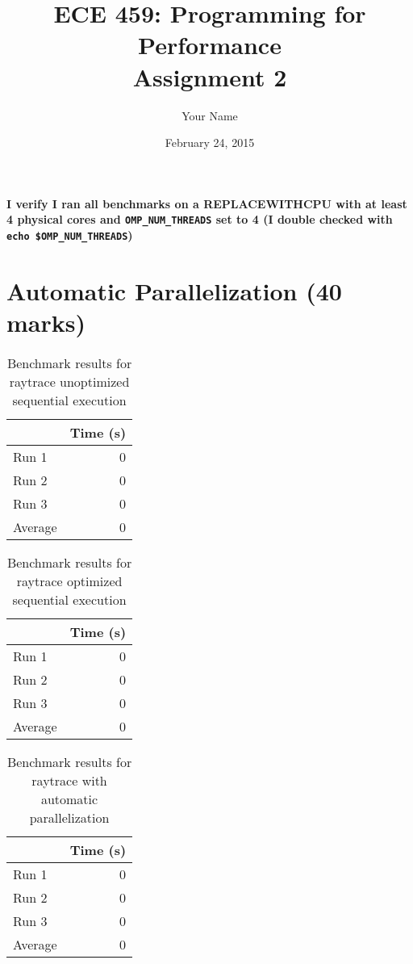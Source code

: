 \documentclass[12pt]{article}
\title{ECE 459: Programming for Performance\\Assignment 2}
\author{Your Name}
\date{February 24, 2015}
\begin{document}
\maketitle

{\bf I verify I ran all benchmarks on a REPLACEWITHCPU with at least 4 physical cores and
{\tt OMP\_NUM\_THREADS} set to 4 (I double checked with
{\tt echo \$OMP\_NUM\_THREADS})}

\section*{Automatic Parallelization (40 marks)}

\begin{table}[H]
  \centering
  \begin{tabular}{lr}
    & {\bf Time (s)} \\
    \hline
    Run 1 & 0 \\
    Run 2 & 0 \\
    Run 3 & 0 \\
    \hline
    Average & 0 \\
  \end{tabular}
  \caption{Benchmark results for raytrace unoptimized sequential execution}
  \label{tbl-raytrace-unopt-sequential}
\end{table}

\begin{table}[H]
  \centering
  \begin{tabular}{lr}
    & {\bf Time (s)} \\
    \hline
    Run 1 & 0 \\
    Run 2 & 0 \\
    Run 3 & 0 \\
    \hline
    Average & 0 \\
  \end{tabular}
  \caption{Benchmark results for raytrace optimized sequential execution}
  \label{tbl-raytrace-opt-sequential}
\end{table}

\begin{table}[H]
  \centering
  \begin{tabular}{lr}
    & {\bf Time (s)} \\
    \hline
    Run 1 & 0 \\
    Run 2 & 0 \\
    Run 3 & 0 \\
    \hline
    Average & 0 \\
  \end{tabular}
  \caption{Benchmark results for raytrace with automatic parallelization}
  \label{tbl-raytrace-automatic}
\end{table}
\end{document}
